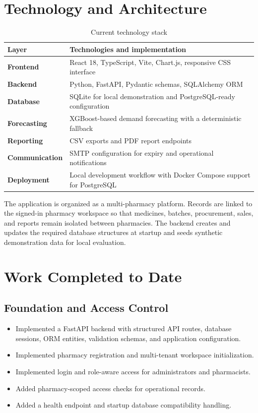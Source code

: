 \documentclass[12pt,a4paper]{article}
\begin{document}
\section{Technology and Architecture}
\begin{table}[h]
\centering
\begin{tabularx}{\textwidth}{>{\bfseries}p{}X}
\toprule
Layer & Technologies and implementation \\
\midrule
Frontend & React 18, TypeScript, Vite, Chart.js, responsive CSS interface \\
Backend & Python, FastAPI, Pydantic schemas, SQLAlchemy ORM \\
Database & SQLite for local demonstration and PostgreSQL-ready configuration \\
Forecasting & XGBoost-based demand forecasting with a deterministic fallback \\
Reporting & CSV exports and PDF report endpoints \\
Communication & SMTP configuration for expiry and operational notifications \\
Deployment & Local development workflow with Docker Compose support for PostgreSQL \\
\bottomrule
\end{tabularx}
\caption{Current technology stack}
\end{table}

The application is organized as a multi-pharmacy platform. Records are linked
to the signed-in pharmacy workspace so that medicines, batches, procurement,
sales, and reports remain isolated between pharmacies. The backend creates and
updates the required database structures at startup and seeds synthetic
demonstration data for local evaluation.

\section{Work Completed to Date}
\subsection{Foundation and Access Control}
\begin{itemize}[leftmargin=*]
    \item Implemented a FastAPI backend with structured API routes, database
    sessions, ORM entities, validation schemas, and application configuration.
    \item Implemented pharmacy registration and multi-tenant workspace
    initialization.
    \item Implemented login and role-aware access for administrators and
    pharmacists.
    \item Added pharmacy-scoped access checks for operational records.
    \item Added a health endpoint and startup database compatibility handling.
\end{itemize}
\end{document}
